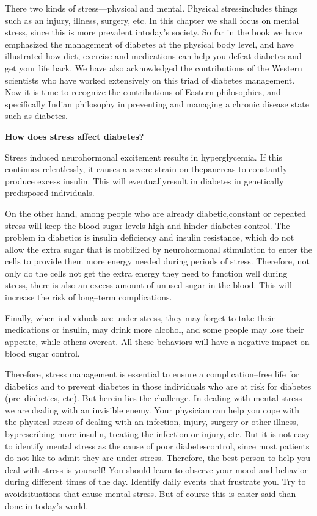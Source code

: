 There two kinds of stress—physical and mental. Physical stress\break includes things such as an injury, illness, surgery, etc. In this chapter we shall focus on mental stress, since this is more prevalent in\break today’s society. So far in the book we have emphasized the management of diabetes at the physical body level, and have illustrated how diet, exercise and medications can help you defeat diabetes and get your life back. We have also acknowledged the contributions of the Western scientists who have worked extensively on this triad of diabetes management. Now it is time to recognize the contributions of Eastern philosophies, and specifically Indian philosophy in preventing and managing a chronic disease state such as diabetes.

\noindent\textbf{How does stress affect diabetes?}

Stress induced neurohormonal excitement results in hypergly\-ce\-mia. If this continues relentlessly, it causes a severe strain on the\break pancreas to constantly produce excess insulin. This will eventually\break result in diabetes in genetically predisposed individuals.

On the other hand, among people who are already diabetic,\break constant or repeated stress will keep the blood sugar levels high and hinder diabetes control. The problem in diabetics is insulin deficiency and insulin resistance, which do not allow the extra sugar that is mobilized by neurohormonal stimulation to enter the cells to provide them more energy needed during periods of stress. Therefore, not only do the cells not get the extra energy they need to function well during stress, there is also an excess amount of unused sugar in the blood. This will increase the risk of long–term complications.

Finally, when individuals are under stress, they may forget to take their medications or insulin, may drink more alcohol, and some people may lose their appetite, while others overeat. All these behaviors will have a negative impact on blood sugar control.

Therefore, stress management is essential to ensure a complica\-tion–free life for diabetics and to prevent diabetes in those indivi\-duals who are at risk for diabetes (pre–diabetics, etc). But herein lies the challenge. In dealing with mental stress we are dealing with an invisible enemy. Your physician can help you cope with the physical stress of dealing with an infection, injury, surgery or other illness, by\break prescribing more insulin, treating the infection or injury, etc. But it is not easy to identify mental stress as the cause of poor diabetes\break control, since most patients do not like to admit they are under stress. Therefore, the best person to help you deal with stress is yourself! You should learn to observe your mood and behavior during different times of the day. Identify daily events that frustrate you. Try to avoid\break situations that cause mental stress. But of course this is easier said than done in today’s world.

